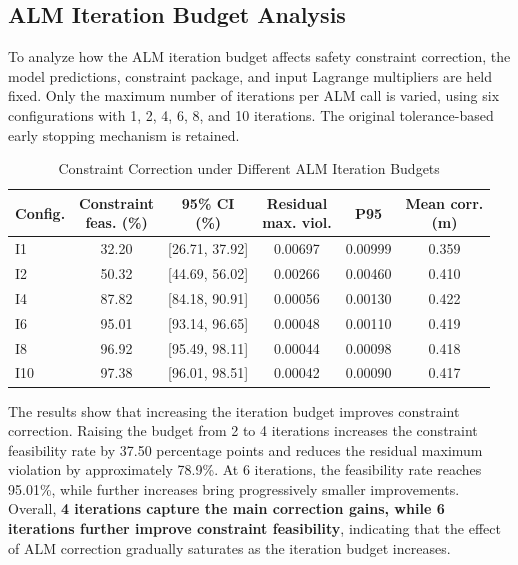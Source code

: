 \documentclass[journal]{IEEEtran}
\begin{document}
\subsection{ALM Iteration Budget Analysis}
To analyze how the ALM iteration budget affects safety constraint correction,
the model predictions, constraint package, and input Lagrange multipliers are
held fixed. Only the maximum number of iterations per ALM call is varied,
using six configurations with 1, 2, 4, 6, 8, and 10 iterations. The original
tolerance-based early stopping mechanism is retained.

\begin{table}[!t]
\caption{Constraint Correction under Different ALM Iteration Budgets}
\label{tab:budget}
\centering
\scriptsize
\setlength{\tabcolsep}{2.5pt}
\begin{tabular}{lccccc}
\hline
Config. & \shortstack{Constraint\\feas. (\%)} & \shortstack{95\% CI\\(\%)} &
\shortstack{Residual\\max. viol.} & P95 & \shortstack{Mean corr.\\(m)} \\
\hline
I1 & 32.20 & [26.71, 37.92] & 0.00697 & 0.00999 & 0.359 \\
I2 & 50.32 & [44.69, 56.02] & 0.00266 & 0.00460 & 0.410 \\
I4 & 87.82 & [84.18, 90.91] & 0.00056 & 0.00130 & 0.422 \\
I6 & 95.01 & [93.14, 96.65] & 0.00048 & 0.00110 & 0.419 \\
I8 & 96.92 & [95.49, 98.11] & 0.00044 & 0.00098 & 0.418 \\
I10 & 97.38 & [96.01, 98.51] & 0.00042 & 0.00090 & 0.417 \\
\hline
\end{tabular}
\end{table}

The results show that increasing the iteration budget improves constraint
correction. Raising the budget from 2 to 4 iterations increases the constraint
feasibility rate by 37.50 percentage points and reduces the residual maximum
violation by approximately 78.9\%. At 6 iterations, the feasibility rate reaches
95.01\%, while further increases bring progressively smaller improvements.
Overall, \textbf{4 iterations capture the main correction gains, while
6 iterations further improve constraint feasibility}, indicating that the
effect of ALM correction gradually saturates as the iteration budget increases.
\end{document}

